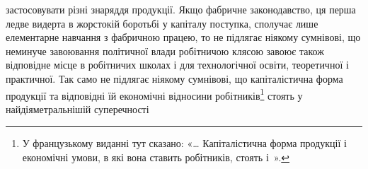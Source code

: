 застосовувати різні знаряддя продукції. Якщо фабричне законодавство,
ця перша ледве видерта в жорстокій боротьбі у капіталу
поступка, сполучає лише елементарне навчання з фабричною працею,
то не підлягає ніякому сумнівові, що неминуче завоювання
політичної влади робітничою клясою завоює також відповідне
місце в робітничих школах і для технологічної освіти, теоретичної
і практичної. Так само не підлягає ніякому сумнівові, що
капіталістична форма продукції та відповідні їй економічні відносини
робітників\footnote*{
У французькому виданні тут сказано: «\dots{} Капіталістична форма
продукції і економічні умови, в які вона ставить робітників, стоять
і~». 
} стоять у найдіяметральнішій суперечності
\parbreak{}  %
